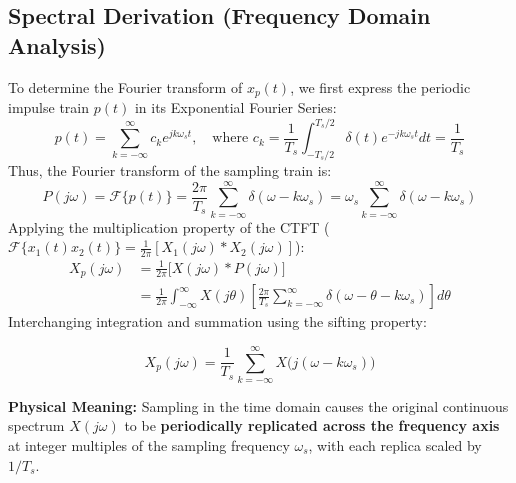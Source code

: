 \documentclass[12pt,a4paper]{article}
\begin{document}
\subsection{Spectral Derivation (Frequency Domain Analysis)}
To determine the Fourier transform of $x_p(t)$, we first express the periodic impulse train $p(t)$ in its Exponential Fourier Series:
\begin{equation}
  p(t) = \sum_{k=-\infty}^{\infty} c_k e^{j k \omega_s t}, \quad \text{where } c_k = \frac{1}{T_s} \int_{-T_s/2}^{T_s/2} \delta(t) e^{-j k \omega_s t} dt = \frac{1}{T_s}
\end{equation}
Thus, the Fourier transform of the sampling train is:
\begin{equation}
  P(j\omega) = \mathcal{F}\{p(t)\} = \frac{2\pi}{T_s} \sum_{k=-\infty}^{\infty} \delta(\omega - k \omega_s) = \omega_s \sum_{k=-\infty}^{\infty} \delta(\omega - k \omega_s)
\end{equation}
Applying the multiplication property of the CTFT ($\mathcal{F}\{x_1(t) x_2(t)\} = \frac{1}{2\pi} [X_1(j\omega) * X_2(j\omega)]$):
\begin{align}
  X_p(j\omega) &= \frac{1}{2\pi} \big[ X(j\omega) * P(j\omega) \big] \\
  &= \frac{1}{2\pi} \int_{-\infty}^{\infty} X(j\theta) \left[ \frac{2\pi}{T_s} \sum_{k=-\infty}^{\infty} \delta(\omega - \theta - k \omega_s) \right] d\theta
\end{align}
Interchanging integration and summation using the sifting property:

\begin{tcolorbox}[formulabox, title={\textbf{Core Formula: Spectrum of Sampled Signal}}]
\begin{equation}
  X_p(j\omega) = \frac{1}{T_s} \sum_{k=-\infty}^{\infty} X\big(j(\omega - k \omega_s)\big)
\end{equation}
\end{tcolorbox}

\textbf{Physical Meaning:}
Sampling in the time domain causes the original continuous spectrum $X(j\omega)$ to be \textbf{periodically replicated across the frequency axis} at integer multiples of the sampling frequency $\omega_s$, with each replica scaled by $1/T_s$.
\end{document}
